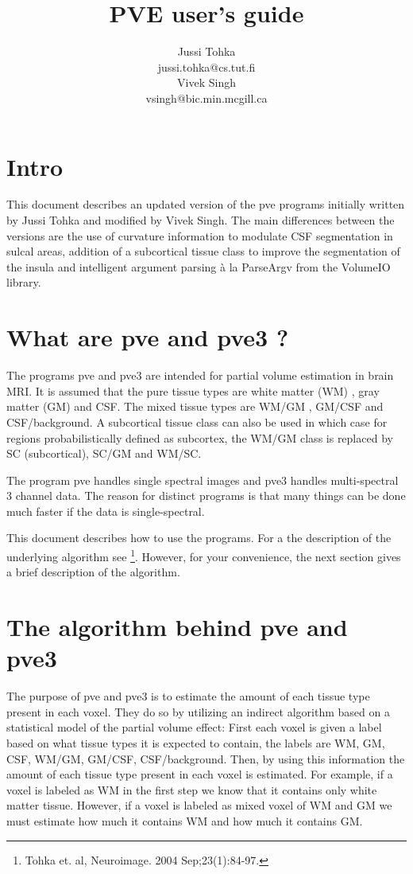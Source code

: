 \documentclass{article}
\title{PVE user's guide}
\author{Jussi Tohka \\ jussi.tohka@cs.tut.fi \\ Vivek Singh  \\ vsingh@bic.min.mcgill.ca}
\begin{document}
\maketitle

\section{Intro}

This document describes an updated version of the pve programs initially
written by Jussi Tohka and modified by Vivek Singh.  The main differences
between the versions are the use of curvature information to modulate CSF
segmentation in sulcal areas, addition of a subcortical tissue class to improve
the segmentation of the insula and intelligent argument parsing \`{a} la 
ParseArgv from the VolumeIO library.

\section{What are pve and pve3 ?}
The programs pve and pve3 are intended for partial volume estimation
in brain MRI.  It is assumed that the pure tissue 
types are white matter (WM) , 
gray matter (GM) and CSF. The mixed tissue types are WM/GM , GM/CSF
and CSF/background.  A subcortical tissue class can also be used in which
case for regions probabilistically defined as subcortex, the WM/GM class
is replaced by SC (subcortical), SC/GM and WM/SC.

The program pve handles single spectral images and pve3 handles
multi-spectral 3 channel data. The reason for distinct programs is
that many things can be done much faster if the data is single-spectral.

This document describes how to use the programs.  For a the description of
the underlying algorithm see \footnote{Tohka et. al, Neuroimage. 2004 Sep;23(1):84-97. }. 
However, for your convenience, the next section gives a brief description of the algorithm.

\section{The algorithm behind pve and pve3}
The purpose of pve and pve3 is to estimate the amount of each tissue
type present in each voxel. They do so by utilizing an indirect
algorithm based on a statistical model of the partial volume effect: 
First each voxel is given a label based on what tissue
types it is expected to contain, the labels are WM, GM, CSF, WM/GM, GM/CSF, CSF/background. 
Then, by using this information the amount of each tissue type present in each voxel is 
estimated. For example, if a voxel is labeled as WM in the first step we know that
it contains only white matter tissue. However, if a voxel is labeled
as mixed voxel of WM and GM we must estimate how much it contains WM
and how much it contains GM.
\end{document}

